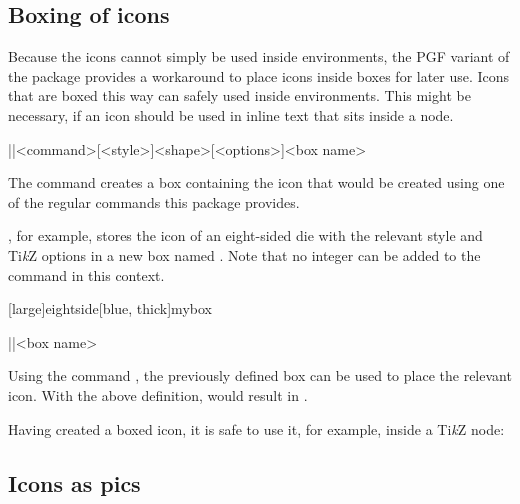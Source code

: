 \documentclass[a4paper]{article}
\begin{document}
\subsection{Boxing of icons}

Because the icons cannot simply be used inside  environments, the PGF variant of the package provides a workaround to place icons inside boxes for later use. Icons that are boxed this way can safely used inside  environments. This might be necessary, if an icon should be used in inline text that sits inside a node.

\begin{macrodef}|\provideprotectedrpgicon|{<command>}[<style>]{<shape>}[<options>]{<box name>}\end{macrodef}
The command \macro{\provideprotectedrpgicon} creates a box containing the icon that would be created using one of the regular commands this package provides.

, for example, stores the icon of an eight-sided die with the relevant style and Ti\emph{k}Z options in a new box named . Note that no integer can be added to the  command in this context.

[large]{eightside}[blue, thick]{mybox}

\begin{macrodef}|\useprotectedrpgicon|{<box name>}\end{macrodef}
Using the command \macro{\useprotectedrpgicon}, the previously defined box can be used to place the relevant icon. With the above definition,  would result in .

Having created a boxed icon, it is safe to use it, for example, inside a Ti\emph{k}Z node:

\begin{codeexample}
\end{codeexample}

\subsection{Icons as pics}\label{sec:pics}
\end{document}
